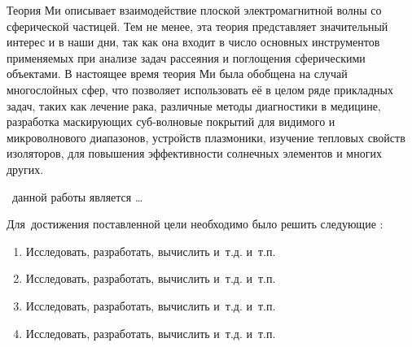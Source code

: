 {\actuality} Теория Ми описывает взаимодействие плоской
электромагнитной волны со сферической частицей.  Тем не менее, эта
теория представляет значительный интерес и в наши дни, так как она
входит в число основных инструментов применяемых при анализе задач
рассеяния и поглощения сферическими объектами.  В настоящее время
теория Ми была обобщена на случай многослойных сфер, что позволяет
использовать её в целом ряде прикладных задач, таких как лечение рака,
различные методы диагностики в медицине, разработка маскирующих
суб-волновые покрытий для видимого и микроволнового диапазонов,
устройств плазмоники, изучение тепловых свойств изоляторов, для
повышения эффективности солнечных элементов и многих других.


 \aim\ данной работы является \ldots

Для~достижения поставленной цели необходимо было решить следующие {\tasks}:
\begin{enumerate}
  \item Исследовать, разработать, вычислить и~т.\:д. и~т.\:п.
  \item Исследовать, разработать, вычислить и~т.\:д. и~т.\:п.
  \item Исследовать, разработать, вычислить и~т.\:д. и~т.\:п.
  \item Исследовать, разработать, вычислить и~т.\:д. и~т.\:п.
\end{enumerate}

